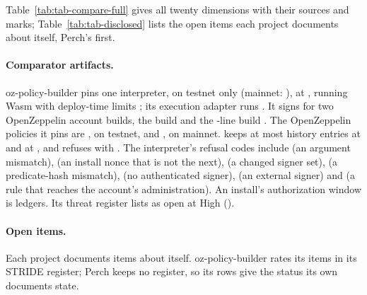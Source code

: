 Table~\ref{tab:tab-compare-full} gives all twenty dimensions with their sources
and marks; Table~\ref{tab:tab-disclosed} lists the open items each project
documents about itself, Perch's first.

\paragraph{Comparator artifacts.} oz-policy-builder pins one interpreter, on
testnet only (mainnet: ), at
, running Wasm 
with deploy-time limits ; its execution adapter runs
. It signs for two OpenZeppelin account builds, the
 build  and the
-line build . The OpenZeppelin
policies it pins are , on testnet, and
, on mainnet.  keeps at most
 history entries at  and
 at , and refuses with
. The interpreter's refusal codes include
 (an argument mismatch),
 (an install nonce that is not the next),
 (a changed signer set),
 (a predicate-hash mismatch),
 (no authenticated signer),
 (an external signer) and
 (a rule that reaches the account's
administration). An install's authorization window is
 ledgers. Its threat register lists
 as open at High ().


\paragraph{Open items.} Each project documents items about itself.
oz-policy-builder rates its items in its STRIDE register; Perch keeps no register,
so its rows give the status its own documents state.

